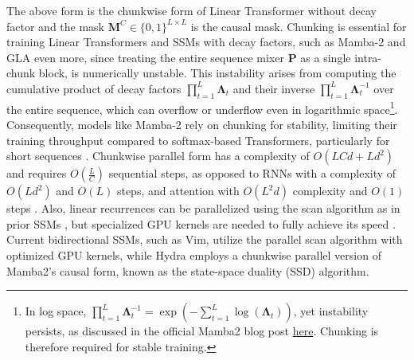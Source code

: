 The above form is the chunkwise form of Linear Transformer without decay factor and the mask $\mathbf{M}^C \in \{0,1\}^{L\times L}$ is the causal mask. Chunking is essential for training Linear Transformers and SSMs with decay factors, such as Mamba-2 \cite{mamba2} and GLA \cite{yang2023gated} even more, since treating the entire sequence mixer \(\mathbf{P}\) as a single intra-chunk block, is numerically unstable. This instability arises from computing the cumulative product of decay factors \(\prod^L_{t=1} \mathbf{\Lambda}_t\) and their inverse \(\prod^L_{t=1} \mathbf{\Lambda}_t^{-1}\) over the entire sequence, which can overflow or underflow even in logarithmic space\footnote{In log space, \(\prod^L_{t=1} \mathbf{\Lambda}_t^{-1} = \exp\left(-\sum^L_{t=1} \log(\mathbf{\Lambda}_t)\right)\), yet instability persists, as discussed in the official Mamba2 blog post \href{https://goombalab.github.io/blog/2024/mamba2-part3-algorithm/}{here}. Chunking is therefore required for stable training.}. Consequently, models like Mamba-2 \cite{mamba2} rely on chunking for stability, limiting their training throughput compared to softmax-based Transformers, particularly for short sequences \cite{deltanet}. Chunkwise parallel form has a complexity of \(O(LCd + Ld^2)\) and requires \(O\left(\frac{L}{C}\right)\) sequential steps, as opposed to RNNs with a complexity of \(O(Ld^2)\) and \(O(L)\) steps, and attention with \(O(L^2d)\) complexity and \(O(1)\) steps \cite{deltanet}. Also, linear recurrences can be parallelized using the scan algorithm as in prior SSMs \cite{s5,mamba}, but specialized GPU kernels are needed to fully achieve its speed  \cite{gateloop,mamba2}. Current bidirectional SSMs, such as Vim, utilize the parallel scan algorithm with optimized GPU kernels, while Hydra employs a chunkwise parallel version of Mamba2's causal form, known as the state-space duality (SSD) algorithm.



